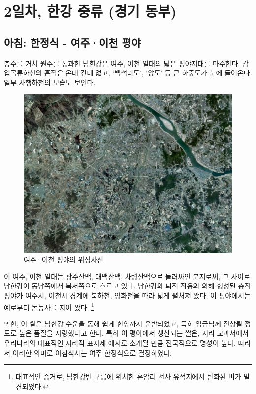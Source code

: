 \chapter{2일차, 한강 중류 (경기 동부)}
\section{아침: 한정식 - 여주·이천 평야}
충주를 거쳐 원주를 통과한 남한강은 여주, 이천 일대의 넓은 평야지대를 마주한다. 
감입곡류하천의 흔적은 온데 간데 없고, ‘백석리도’, ‘양도’ 등 큰 하중도가 눈에 들어온다.
일부 사행하천의 모습도 보인다.

\begin{figure}
    \centering
    \includegraphics[width=.6\textwidth]{img/여주이천평야.jpg}
    \caption{여주·이천 평야의 위성사진\protect\footnotemark}
    \label{fig:my_label}
\end{figure}


이 여주, 이천 일대는 
광주산맥, 태백산맥, 차령산맥으로 둘러싸인 분지로써,
그 사이로 남한강이 동남쪽에서 북서쪽으로 흐르고 있다.
남한강의 퇴적 작용의 의해 형성된 충적평야가 여주시, 이천시 경계에 북하천, 양화천을 따라 넓게 펼처져 왔다.
이 평야에서는 예로부터 논농사를 지어 왔다.
\footnote{대표적인 증거로, 남한강변 구릉에 위치한 \href{https://terms.naver.com/entry.naver?docId=1793906&cid=49217&categoryId=49217}{혼암리 선사 유적지}에서 탄화된 벼가 발견되었다.}


또한, 이 쌀은 남한강 수운을 통해 쉽게 한양까지 운반되었고, 특히 임금님께 진상될 정도로 높은 품질을 자랑했다고 한다.
특히 이 평야에서 생산되는 쌀은, 지리 교과서에서 우리나라의 대표적인 지리적 표시제 예시로 소개될 만큼 전국적으로 명성이 높다.
따라서 이러한 의미로 아침식사는 여주 한정식으로 결정하였다.
 

